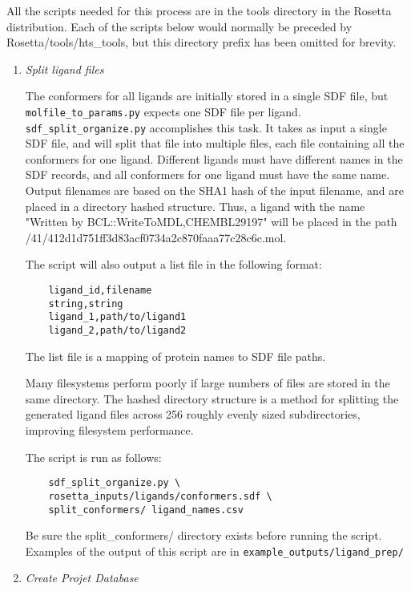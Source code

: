All the scripts needed for this process are in the tools directory in the Rosetta distribution. 
Each of the scripts below would normally be preceded by Rosetta/tools/hts\_tools, but this directory prefix has been omitted for brevity.

\begin{enumerate}
\def\labelenumi{\arabic{enumi}.}
\item
	\emph{Split ligand files}

	The conformers for all ligands are initially stored in a single \ac{SDF} file, but\\
	\texttt{molfile\_to\_params.py} expects one \ac{SDF} file per ligand.\\
	\texttt{sdf\_split\_organize.py} accomplishes this task. 
	It takes as input a single \ac{SDF} file, and will split that file into multiple files, each file containing all the conformers for one ligand.
	Different ligands must have different names in the \ac{SDF} records, and all conformers for one ligand must have the same name. 
	Output filenames are based on the SHA1 hash of the input filename, and are placed in a directory hashed structure.
	Thus, a ligand with the name "Written by BCL::WriteToMDL,CHEMBL29197" will be placed in the path\\
	 /41/412d1d751ff3d83acf0734a2c870faaa77c28c6c.mol.

	The script will also output a list file in the following format:

	\begin{verbatim}
	ligand_id,filename
	string,string
	ligand_1,path/to/ligand1
	ligand_2,path/to/ligand2
	\end{verbatim}
	
	The list file is a mapping of protein names to \ac{SDF} file paths.

	Many filesystems perform poorly if large numbers of files are stored in the same directory.
	The hashed directory structure is a method for splitting the generated ligand files across 256 roughly evenly sized subdirectories, improving filesystem performance.

	The script is run as follows:

	\begin{verbatim}
	sdf_split_organize.py \
	rosetta_inputs/ligands/conformers.sdf \
	split_conformers/ ligand_names.csv
	\end{verbatim}

	Be sure the split\_conformers/ directory exists before running the script.
	Examples of the output of this script are in \texttt{example\_outputs/ligand\_prep/}
\item
	\emph{Create Projet Database}


\end{enumerate}
